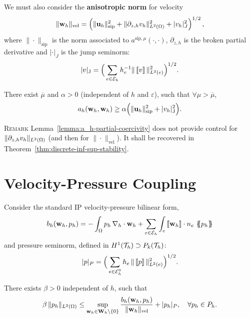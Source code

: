 \documentclass[25pt, a0paper, portrait, leqno, margin=0mm, innermargin=25mm,
blockverticalspace=15mm, colspace=15mm, subcolspace=8mm]{tikzposter}
\begin{document}
{\begin{multicols*}{3}
    We must also consider the \textbf{anisotropic norm} for velocity
    $$
    \|\wh\|_\mathrm{vel} = \left(\|\uh\|_{\text{sip}}^2 +
      \|\partial_{z,h}\vh\|_{L^2(\Omega)}^2 + |\vh|_J^2\right)^{1/2},
    $$
    where $\|\cdot\|_{\text{sip}}$ is the norm associated to
    $a^{\text{sip},\mu}(\cdot,\cdot)$, $\partial_{z,h}$ is the broken
    partial derivative and $|\cdot|_J$ is the jump seminorm:
    $$
    \seminormJ{\vv} = \Big (\sum_{e\in\Eh} h_e^{-1} \norm[L^2(e)]{\jump\vv}^2 \Big ) ^{1/2}.
    $$

    \begin{lemma}
      \label{lemma:a_h-partial-coercivity}
      There exist $\overline{\mu} $ and $ \alpha >0$  (independent of $h$ and  $\varepsilon$), such that
      $ \forall \mu > \overline{\mu}$,
      $$
        a_h ( \wh, \wh ) \ge \alpha \Big ( \normsip{\uh}^2
        + \seminormJ{\vh}^2  \Big ).
        $$
    \end{lemma}

    \begin{paragraph}{\textsc{Remark}}
      Lemma~\ref{lemma:a_h-partial-coercivity} does not provide
      control for $\|\partial_{z,h} \vh\|_{L^2(\Omega)}$ (and then for
      $\|\cdot\|_\mathrm{vel}$). It shall be recovered in
      Theorem~\ref{thm:discrete-inf-sup-stability}.
    \end{paragraph}

    \section{\color{colorTwo}Velocity-Pressure  Coupling\dotfill}

    Consider the standard IP velocity-pressure bilinear form,
    $$
    b_h(\wh, \ph )= -\int_{\Omega} \ph\, \gradh \cdot \wh +
    \sum_{e\in\Eh} \int_e \jump{\wh} \cdot n_e\, \average{\ph}
    $$
    and pressure seminorm, defined in
    $ H^1(\Th ) \supset P_{k}( \Th )$:
    $$
    |p|_P  = \Big ( \sum_{e\in\Ehi} h_e \, \| \jump{p} \|_{L^2(e)}^2 \Big )^{1/2}.
    $$

    \begin{lemma} There exists
      \label{lemma:b_h-stability}
      $\beta > 0$ independent of $h$, such that
      $$
      \beta \, \| \ph \|_{L^2(\Omega)} \le \sup_{\wh \in \Wh \setminus
        \{0\}} \frac{b_h ( \wh, \ph )}{\normvel{\wh}}
      + |\ph|_P , \quad \forall \ph \in \Ph.
      $$
    \end{lemma}


\end{multicols*}}
\end{document}

